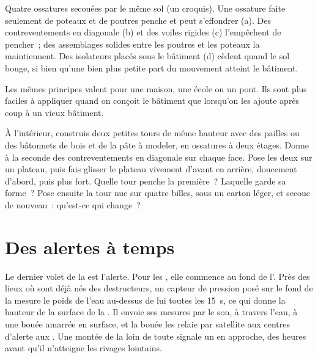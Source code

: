\begin{omfigure}
{\small Quatre ossatures secouées par le même sol (un croquis). Une
ossature faite seulement de poteaux et de poutres penche et peut
s'effondrer (a). Des contreventements en diagonale (b) et des voiles
rigides (c) l'empêchent de pencher~; des assemblages solides entre les
poutres et les poteaux la maintiennent. Des isolateurs placés sous le
bâtiment (d) cèdent quand le sol bouge, si bien qu'une bien plus petite
part du mouvement atteint le bâtiment.}
\label{fig:g9:natural-risks:buildings}
\end{omfigure}

Les mêmes principes valent pour une maison, une école ou un pont. Ils sont
plus faciles à appliquer quand on conçoit le bâtiment que lorsqu'on les
ajoute après coup à un vieux bâtiment.

\begin{inthelab}
À l'intérieur, construis deux petites tours de même hauteur avec des
pailles ou des bâtonnets de bois et de la pâte à modeler, en ossatures à
deux étages. Donne à la seconde des contreventements en diagonale sur
chaque face. Pose les deux sur un plateau, puis fais glisser le plateau
vivement d'avant en arrière, doucement d'abord, puis plus fort. Quelle tour
penche la première~? Laquelle garde sa forme~? Pose ensuite la tour nue sur
quatre billes, sous un carton léger, et secoue de nouveau~: qu'est-ce qui
change~?
\end{inthelab}

\section{Des alertes à temps}

Le dernier volet de la  est l'alerte. Pour les , elle
commence au fond de l'. Près des lieux où sont déjà nés des 
destructeurs, un capteur de pression posé sur le fond de la  mesure le
poids de l'eau au-dessus de lui toutes les \qty{15}{s}, ce qui donne la
hauteur de la surface de la . Il envoie ses mesures par le son, à
travers l'eau, à une bouée amarrée en surface, et la bouée les relaie par
satellite aux centres d'alerte aux . Une montée de la  loin de
toute  signale un  en approche, des heures avant qu'il
n'atteigne les rivages lointains.

